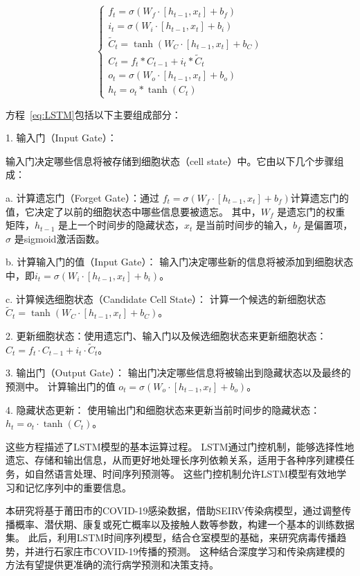 \begin{equation}
	\label{eq:LSTM}
	\left\{
	\begin{array}{l}
		f_t=\sigma\left(W_f \cdot\left[h_{t-1}, x_t\right]+b_f\right)             \\
		i_t=\sigma\left(W_i \cdot\left[h_{t-1}, x_t\right]+b_i\right)             \\
		\widetilde{C}_t=\tanh \left(W_C \cdot\left[h_{t-1}, x_t\right]+b_C\right) \\
		C_t=f_t * C_{t-1}+i_t * \widetilde{C}_t                                   \\
		o_t=\sigma\left(W_o \cdot\left[h_{t-1}, x_t\right]+b_o\right)             \\
		h_t=o_t * \tanh \left(C_t\right)
	\end{array}
	\right.
\end{equation}

方程~\eqref{eq:LSTM}包括以下主要组成部分：

1. 输入门（Input Gate）：

输入门决定哪些信息将被存储到细胞状态（cell state）中。它由以下几个步骤组成：

a. 计算遗忘门（Forget Gate）：通过 $f_t= \sigma(W_f \cdot [h_{t-1}, x_t] + b_f)$计算遗忘门的值，它决定了以前的细胞状态中哪些信息要被遗忘。
其中，$W_f$ 是遗忘门的权重矩阵，$h_{t-1}$ 是上一个时间步的隐藏状态，$x_t$ 是当前时间步的输入，$b_f$ 是偏置项，$\sigma$ 是sigmoid激活函数。

b. 计算输入门的值（Input Gate）： 输入门决定哪些新的信息将被添加到细胞状态中，即$i_t = \sigma(W_i \cdot [h_{t-1}, x_t] + b_i)$。

c. 计算候选细胞状态（Candidate Cell State）： 计算一个候选的新细胞状态 $\tilde{C}_t= \tanh(W_C \cdot [h_{t-1}, x_t] + b_C)$。

2. 更新细胞状态：使用遗忘门、输入门以及候选细胞状态来更新细胞状态：$C_t = f_t \cdot C_{t-1} + i_t \cdot \tilde{C}_t$。

3. 输出门（Output Gate）： 输出门决定哪些信息将被输出到隐藏状态以及最终的预测中。 计算输出门的值 $o_t = \sigma(W_o \cdot [h_{t-1}, x_t] + b_o)$。

4. 隐藏状态更新： 使用输出门和细胞状态来更新当前时间步的隐藏状态：$h_t = o_t \cdot \tanh(C_t)$。

这些方程描述了LSTM模型的基本运算过程。
LSTM通过门控机制，能够选择性地遗忘、存储和输出信息，从而更好地处理长序列依赖关系，适用于各种序列建模任务，如自然语言处理、时间序列预测等。
这些门控机制允许LSTM模型有效地学习和记忆序列中的重要信息。


本研究将基于莆田市的COVID-19感染数据，借助SEIRV传染病模型，通过调整传播概率、潜伏期、康复或死亡概率以及接触人数等参数，构建一个基本的训练数据集。
此后，利用LSTM时间序列模型，结合仓室模型的基础，来研究病毒传播趋势，并进行石家庄市COVID-19传播的预测。
这种结合深度学习和传染病建模的方法有望提供更准确的流行病学预测和决策支持。

